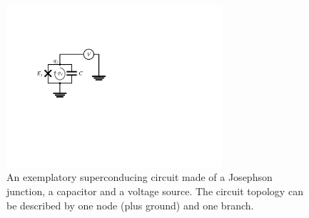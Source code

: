 \begin{figure}
	\includegraphics[width=8cm]{"./material/figures/introduction/sample_circuit"}
	\caption{An exemplatory superconducing circuit made of a Josephson junction, a capacitor and a voltage source. The circuit topology can be described by one node (plus ground) and one branch.}
	\label{fig:SampleCircuit}
\end{figure}

